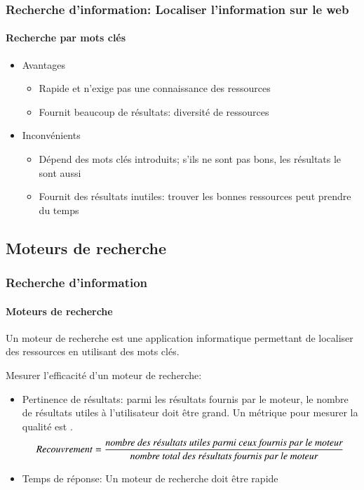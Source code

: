 \documentclass[xcolor=table]{beamer}
\begin{document}
\begin{frame}
\frametitle{Recherche d'information: Localiser l'information sur le web}
\framesubtitle{Recherche par mots clés}

\begin{itemize}
	\item Avantages
	\begin{itemize}
		\item Rapide et n'exige pas une connaissance des ressources
		\item Fournit beaucoup de résultats: diversité de ressources
	\end{itemize}
	\item Inconvénients
	\begin{itemize}
		\item Dépend des mots clés introduits; s'ils ne sont pas bons, les résultats le sont aussi
		\item Fournit des résultats inutiles: trouver les bonnes ressources peut prendre du temps
	\end{itemize}
\end{itemize} 

\end{frame}


\subsection{Moteurs de recherche}

\begin{frame}
\frametitle{Recherche d'information}
\framesubtitle{Moteurs de recherche}

\begin{definition}
	Un moteur de recherche est une application informatique permettant de localiser des ressources en utilisant des mots clés.
\end{definition}

Mesurer l'efficacité d'un moteur de recherche:
\begin{itemize}
	\item Pertinence de résultats: parmi les résultats fournis par le moteur, le nombre de résultats utiles à l'utilisateur doit être grand. Un métrique pour mesurer la qualité est .
	{\scriptsize \[ Recouvrement = \frac{\text{\itshape nombre des résultats utiles parmi ceux fournis par le moteur}}{\text{\itshape nombre total des résultats fournis par le moteur}} \]}
	\item Temps de réponse: Un moteur de recherche doit être rapide
\end{itemize}

\end{frame}
\end{document}
